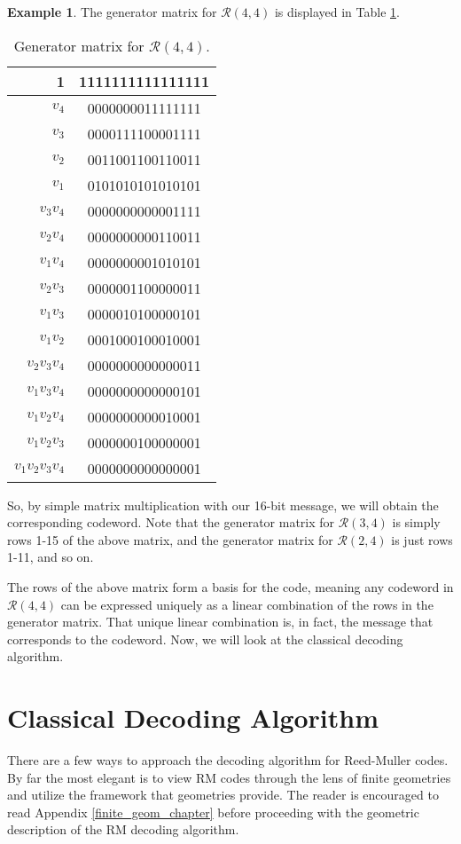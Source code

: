 \documentclass[12pt,twoside]{reedthesis}
\theoremstyle{definition}
\newtheorem{example}[theorem]{Example}
\begin{document}
\begin{example} \label{gen_matrix_ex}
The generator matrix for $\mathscr{R}(4,4)$ is displayed in Table \ref{gen_matrix}.
\begin{table}
\begin{center}
\begin{tabular}{ r c }
 1 & 1111111111111111 \\ 
 \hline
$v_4$ & 0000000011111111 \\  
$v_3$ & 0000111100001111 \\
$v_2$ & 0011001100110011  \\
$v_1$ & 0101010101010101 \\
\hline
$v_3v_4$ & 0000000000001111  \\
$v_2v_4$ & 0000000000110011 \\
$v_1v_4$ & 0000000001010101  \\
$v_2v_3$ & 0000001100000011  \\
$v_1v_3$ & 0000010100000101  \\
$v_1v_2$ & 0001000100010001  \\
\hline
$v_2v_3v_4$ & 0000000000000011 \\
$v_1v_3v_4$ & 0000000000000101 \\
$v_1v_2v_4$ & 0000000000010001  \\
$v_1v_2v_3$ & 0000000100000001  \\
\hline
$v_1v_2v_3v_4$ & 0000000000000001 
\end{tabular}
\caption{Generator matrix for $\mathscr{R}(4,4)$. \label{gen_matrix}}
\end{center} 
\end{table}
So, by simple matrix multiplication with our 16-bit message, we will obtain the corresponding codeword. Note that the generator matrix for $\mathscr{R}(3,4)$ is simply rows 1-15 of the above matrix, and the generator matrix for $\mathscr{R}(2,4)$ is just rows 1-11, and so on. 

The rows of the above matrix form a basis for the code, meaning any codeword in $\mathscr{R}(4,4)$ can be expressed uniquely as a linear combination of the rows in the generator matrix. That unique linear combination is, in fact, the message that corresponds to the codeword. Now, we will look at the classical decoding algorithm.
\end{example}
\section{Classical Decoding Algorithm}
There are a few ways to approach the decoding algorithm for Reed-Muller codes. By far the most elegant is to view RM codes through the lens of finite geometries and utilize the framework that geometries provide. The reader is encouraged to read Appendix \ref{finite_geom_chapter} before proceeding with the geometric description of the RM decoding algorithm.
\end{document}
